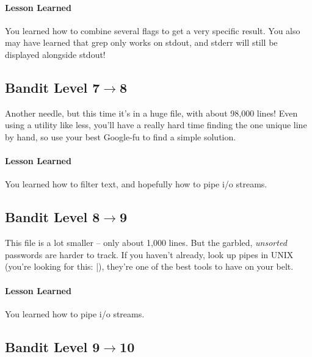 \documentclass[12pt]{article}
\begin{document}
\paragraph{Lesson Learned}
You learned how to combine several flags to get a very specific result.
You also may have learned that grep only works on stdout, and stderr will still be displayed alongside stdout!

\subsection{Bandit Level 7$\to$8}

Another needle, but this time it's in a huge file, with about 98,000 lines!
Even using a utility like less, you'll have a really hard time finding the one unique line by hand, so use your best Google-fu to find a simple solution.

\paragraph{Lesson Learned}
You learned how to filter text, and hopefully how to pipe i/o streams.

\subsection{Bandit Level 8$\to$9}

This file is a lot smaller -- only about 1,000 lines.
But the garbled, \emph{unsorted} passwords are harder to track.
If you haven't already, look up pipes  in UNIX (you're looking for this: \verb|||), they're one of the best tools to have on your belt.

\paragraph{Lesson Learned}
You learned how to pipe i/o streams.
 
\subsection{Bandit Level 9$\to$10}
\end{document}
